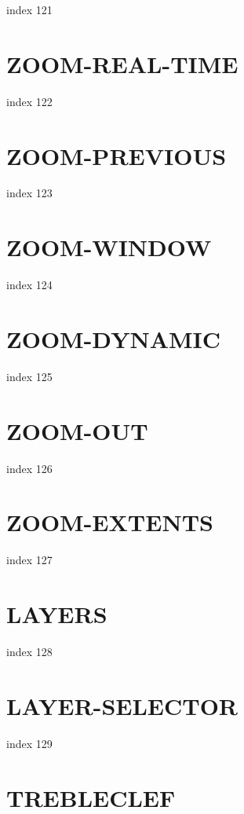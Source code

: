 \documentclass[10pt]{report}
\begin{document}
index 121

\section{ZOOM-REAL-TIME}

index 122

\section{ZOOM-PREVIOUS}

index 123

\section{ZOOM-WINDOW}

index 124

\section{ZOOM-DYNAMIC}

index 125

\section{ZOOM-OUT}

index 126

\section{ZOOM-EXTENTS}

index 127

\section{LAYERS}

index 128

\section{LAYER-SELECTOR}

index 129

\section{TREBLECLEF}
\end{document}
